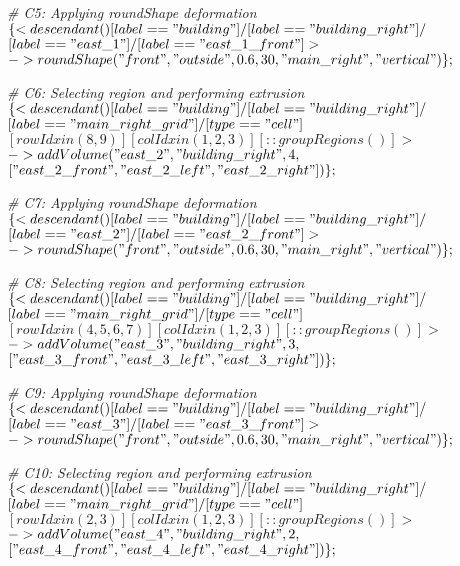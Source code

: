 \noindent \textit{\# C5: Applying roundShape deformation}\\
$\{< descendant() [label=="building"] / [label=="building\_right"] / $\\
$[label=="east\_1"] / [label=="east\_1\_front"] > $\\
$-> roundShape("front", "outside", 0.6, 30, "main\_right", "vertical")\};$

\noindent \textit{\# C6: Selecting region and performing extrusion}\\
$\{< descendant() [label=="building"] / [label=="building\_right"] / $\\
$[label=="main\_right\_grid"] / [type=="cell"] $\\
$[rowIdx in (8, 9)] [colIdx in (1, 2, 3)] [::groupRegions()] > $\\
$-> addVolume("east\_2", "building\_right", 4, $\\
$["east\_2\_front", "east\_2\_left", "east\_2\_right"])\};$

\noindent \textit{\# C7: Applying roundShape deformation}\\
$\{< descendant() [label=="building"] / [label=="building\_right"] / $\\
$[label=="east\_2"] / [label=="east\_2\_front"] > $\\
$-> roundShape("front", "outside", 0.6, 30, "main\_right", "vertical")\};$

\noindent \textit{\# C8: Selecting region and performing extrusion}\\
$\{< descendant() [label=="building"] / [label=="building\_right"] / $\\
$[label=="main\_right\_grid"] / [type=="cell"] $\\
$[rowIdx in (4, 5, 6, 7)] [colIdx in (1, 2, 3)] [::groupRegions()] > $\\
$-> addVolume("east\_3", "building\_right", 3, $\\
$["east\_3\_front", "east\_3\_left", "east\_3\_right"])\};$

\noindent \textit{\# C9: Applying roundShape deformation}\\
$\{< descendant() [label=="building"] / [label=="building\_right"] / $\\
$[label=="east\_3"] / [label=="east\_3\_front"] > $\\
$-> roundShape("front", "outside", 0.6, 30, "main\_right", "vertical")\};$

\noindent \textit{\# C10: Selecting region and performing extrusion}\\
$\{< descendant() [label=="building"] / [label=="building\_right"] / $\\
$[label=="main\_right\_grid"] / [type=="cell"] $\\
$[rowIdx in (2, 3)] [colIdx in (1, 2, 3)] [::groupRegions()] > $\\
$-> addVolume("east\_4", "building\_right", 2, $\\
$["east\_4\_front", "east\_4\_left", "east\_4\_right"])\};$


